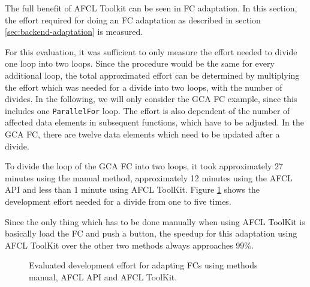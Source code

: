 \documentclass[a4paper,top=25mm,bottom=25mm,12pt,pdftex,halfparskip,twoside,openany,bibtotoc,numbers=noenddot]{scrbook}
\begin{document}
The full benefit of AFCL Toolkit can be seen in FC adaptation.
In this section, the effort required for doing an FC adaptation as described in section \ref{sec:backend-adaptation} is measured.

For this evaluation, it was sufficient to only measure the effort needed to divide one loop into two loops. Since the procedure would be the same for every additional loop, the total approximated effort can be determined by multiplying the effort which was needed for a divide into two loops, with the number of divides.
In the following, we will only consider the GCA FC example, since this includes one \texttt{ParallelFor} loop.
The effort is also dependent of the number of affected data elements in subsequent functions, which have to be adjusted. In the GCA FC, there are twelve data elements which need to be updated after a divide.

To divide the loop of the GCA FC into two loops, it took approximately 27 minutes using the manual method, approximately 12 minutes using the AFCL API and less than 1 minute using AFCL ToolKit. Figure \ref{fig:evaluation-adaptation} shows the development effort needed for a divide from one to five times.  

\clearpage

Since the only thing which has to be done manually when using AFCL ToolKit is basically load the FC and push a button, the speedup for this adaptation using AFCL ToolKit over the other two methods always approaches 99\%.

\begin{figure}[h]
\vspace{1.5cm}
\caption{Evaluated development effort for adapting FCs using methods manual, AFCL API and AFCL ToolKit.}
\label{fig:evaluation-adaptation}
\end{figure}

\end{document}
